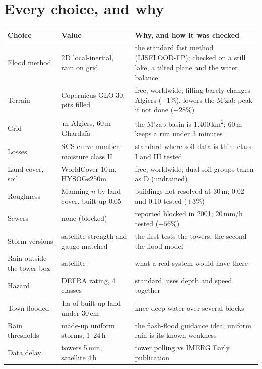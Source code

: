 \section{Every choice, and why}
\label{sec:p5_choices}
\begin{center}\footnotesize\setlength{\tabcolsep}{4pt}
\begin{tabular}{>{\raggedright\arraybackslash}p{2.8cm}>{\raggedright\arraybackslash}p{3.6cm}>{\raggedright\arraybackslash}p{6.9cm}}
\toprule
Choice & Value & Why, and how it was checked\\
\midrule
Flood method & 2D local-inertial, rain on grid & the standard fast method (LISFLOOD-FP); checked on a still lake, a tilted plane and the
water balance\\
Terrain & Copernicus GLO-30, pits filled & free, worldwide; filling barely changes Algiers ($-1\%$), lowers the M'zab peak if not done
($-28\%$)\\
Grid & 30\,m Algiers, 60\,m Ghardaïa & the M'zab basin is 1{,}400\,km\textsuperscript{2}; 60\,m keeps a run under 3 minutes\\
Losses & SCS curve number, moisture class II & standard where soil data is thin; class I and III tested\\
Land cover, soil & WorldCover 10\,m, HYSOGs250m & free, worldwide; dual soil groups taken as D (undrained)\\
Roughness & Manning $n$ by land cover, built-up 0.05 & buildings not resolved at 30\,m; 0.02 and 0.10 tested ($\pm3\%$)\\
Sewers & none (blocked) & reported blocked in 2001; 20\,mm/h tested ($-56\%$)\\
Storm versions & satellite-strength and gauge-matched & the first tests the towers, the second the flood model\\
Rain outside the tower box & satellite & what a real system would have there\\
Hazard & DEFRA rating, 4 classes & standard, uses depth and speed together\\
Town flooded & 5\,ha of built-up land under 30\,cm & knee-deep water over several blocks\\
Rain thresholds & made-up uniform storms, 1--24\,h & the flash-flood guidance idea; uniform rain is its known weakness\\
Data delay & towers 5\,min, satellite 4\,h & tower polling vs IMERG Early publication\\
\bottomrule
\end{tabular}
\end{center}

